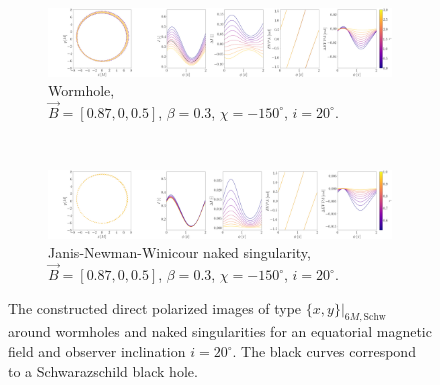 \documentclass[12pt]{article}
\numberwithin{equation}{section}
\numberwithin{figure}{section}
\begin{document}
	\begin{figure}[!htb]
		\begin{subfigure}{16cm}
			\hspace{-1.0em}
			\includegraphics[scale = 0.15]{Section_7_Polarized_Emission/WH_delta_fig_B_0.87_0.5_0_20_deg_r6.png}
			\caption{Wormhole,\\ $\vec{B} = [0.87, 0, 0.5]$, $\beta = 0.3$, $\chi = -150^\circ$, $i = 20^\circ$.} 
		\end{subfigure}\\
		\begin{subfigure}{17cm}
			\hspace{-1em}
			\includegraphics[scale = 0.15]{Section_7_Polarized_Emission/JNW_delta_figs_B_0.87_0.0_0.5_20_deg_direct.png}
			\caption{Janis-Newman-Winicour naked singularity,\\  $\vec{B} = [0.87, 0, 0.5]$, $\beta = 0.3$, $\chi = -150^\circ$, $i = 20^\circ$.}
		\end{subfigure}
		\caption[The polarized direct images around wormholes and naked singularities for an equatorial magnetic field at $i = 20^\circ$.]{\small The constructed direct polarized images of type $\{x,y\}\vert_{6M, \text{Schw}}$ around wormholes and naked singularities for an equatorial magnetic field and observer inclination $i = 20^\circ$. The black curves correspond to a Schwarazschild black hole.} 
		\label{Direct_image_deltas_20}
	\end{figure}
	
\end{document}
